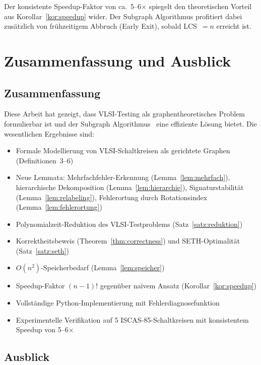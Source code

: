 ﻿\documentclass[a4paper,12pt]{article}
\theoremstyle{definition}
\begin{document}
Der konsistente Speedup-Faktor von ca.\ 5--6$\times$ spiegelt den
theoretischen Vorteil aus Korollar~\ref{kor:speedup} wider. Der
Subgraph Algorithmus profitiert dabei zusätzlich von frühzeitigem
Abbruch (Early Exit), sobald LCS~$=n$ erreicht ist.

\section{Zusammenfassung und Ausblick}
\label{sec:ausblick}

\subsection{Zusammenfassung}

Diese Arbeit hat gezeigt, dass VLSI-Testing als graphentheoretisches
Problem formulierbar ist und der Subgraph
Algorithmus~\cite{epp2026subgraph} eine effiziente Lösung bietet.
Die wesentlichen Ergebnisse sind:

\begin{itemize}
  \item Formale Modellierung von VLSI-Schaltkreisen als gerichtete
        Graphen (Definitionen~3--6)
  \item Neue Lemmata: Mehrfachfehler-Erkennung (Lemma~\ref{lem:mehrfach}),
        hierarchische Dekomposition (Lemma~\ref{lem:hierarchie}),
        Signaturstabilität (Lemma~\ref{lem:relabeling}),
        Fehlerortung durch Rotationsindex (Lemma~\ref{lem:fehlerortung})
  \item Polynomialzeit-Reduktion des VLSI-Testproblems
        (Satz~\ref{satz:reduktion})
  \item Korrektheitsbeweis (Theorem~\ref{thm:correctness}) und
        SETH-Optimalität (Satz~\ref{satz:seth})
  \item $O(n^2)$-Speicherbedarf (Lemma~\ref{lem:speicher})
  \item Speedup-Faktor $(n-1)!$ gegenüber naivem Ansatz
        (Korollar~\ref{kor:speedup})
  \item Vollständige Python-Implementierung mit Fehlerdiagnosefunktion
  \item Experimentelle Verifikation auf 5 ISCAS-85-Schaltkreisen mit
        konsistentem Speedup von 5--6$\times$
\end{itemize}

\subsection{Ausblick}
\end{document}
